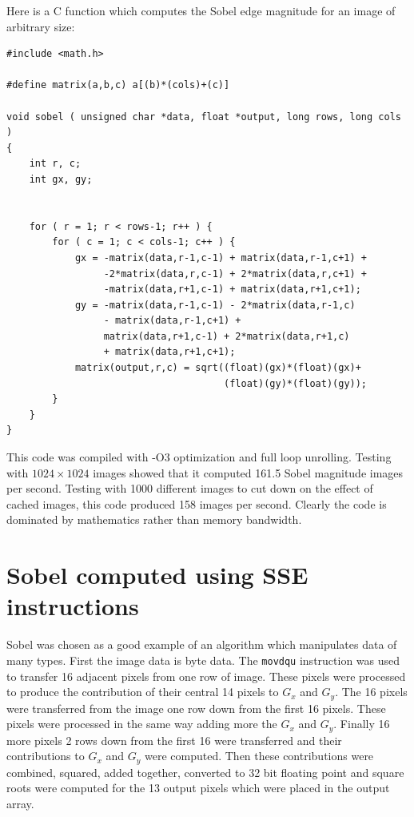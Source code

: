 \documentclass[11pt,b5paper]{book}
\begin{document}
Here is a C function which computes the Sobel edge magnitude for an
image of arbitrary size:
\begin{verbatim}
#include <math.h>

#define matrix(a,b,c) a[(b)*(cols)+(c)]

void sobel ( unsigned char *data, float *output, long rows, long cols )
{
    int r, c;
    int gx, gy;


    for ( r = 1; r < rows-1; r++ ) {
        for ( c = 1; c < cols-1; c++ ) {
            gx = -matrix(data,r-1,c-1) + matrix(data,r-1,c+1) +
                 -2*matrix(data,r,c-1) + 2*matrix(data,r,c+1) +
                 -matrix(data,r+1,c-1) + matrix(data,r+1,c+1);
            gy = -matrix(data,r-1,c-1) - 2*matrix(data,r-1,c)
                 - matrix(data,r-1,c+1) +
                 matrix(data,r+1,c-1) + 2*matrix(data,r+1,c)
                 + matrix(data,r+1,c+1);
            matrix(output,r,c) = sqrt((float)(gx)*(float)(gx)+
                                      (float)(gy)*(float)(gy));
        }
    }
}
\end{verbatim}

This code was compiled with {-O3} optimization and full loop unrolling.
Testing with $1024\times1024$ images showed that it computed 161.5 Sobel
magnitude images per second.
Testing with 1000 different images to cut down on the effect of cached
images, this code produced 158 images per second.
Clearly the code is dominated by mathematics rather than memory bandwidth.

\section{Sobel computed using SSE instructions}

Sobel was chosen as a good example of an algorithm which manipulates
data of many types.
First the image data is byte data.
The {\tt movdqu} instruction was used to transfer 16 adjacent pixels 
from one row of image.
These pixels were processed to produce the contribution of their
central 14 pixels to $G_x$ and $G_y$.
The 16 pixels were transferred from the image one row down from the first
16 pixels.
These pixels were processed in the same way adding more the $G_x$ and $G_y$.
Finally 16 more pixels 2 rows down from the first 16 were transferred and
their contributions to $G_x$ and $G_y$ were computed.
Then these contributions were combined, squared, added together, converted
to 32 bit floating point and square roots were computed for the 13 output
pixels which were placed in the output array.
\end{document}
